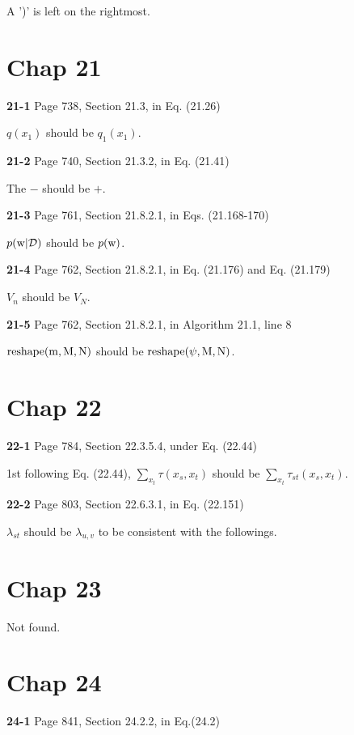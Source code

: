 \documentclass[aps,preprint,a4]{revtex4-1}
\begin{document}
A ')' is left on the rightmost.




\section{Chap 21}
{\color{red}\textbf{21-1}} Page 738, Section 21.3, in Eq. (21.26) 

$q(x_{1})$ should be $q_{1}(x_{1})$.

{\color{red}\textbf{21-2}} Page 740, Section 21.3.2, in Eq. (21.41)

The $-$ should be $+$.

{\color{red}\textbf{21-3}} Page 761, Section 21.8.2.1, in Eqs. (21.168-170)

$p(\rm w|\mathcal D)$ should be $p(\rm w)$.

{\color{red}\textbf{21-4}} Page 762, Section 21.8.2.1, in Eq. (21.176) and Eq. (21.179)

$V_{n}$ should be $V_{N}$.

{\color{red}\textbf{21-5}} Page 762, Section 21.8.2.1, in Algorithm 21.1, line 8

$\rm reshape(m,M,N)$ should be $\rm reshape(\psi,M,N)$.




\section{Chap 22}
{\color{red}\textbf{22-1}} Page 784, Section 22.3.5.4, under Eq. (22.44)

1st following Eq. (22.44), $\sum_{x_{t}}\tau(x_{s},x_{t})$ should be $\sum_{x_{t}}\tau_{st}(x_{s},x_{t})$.

{\color{red}\textbf{22-2}} Page 803, Section 22.6.3.1, in Eq. (22.151)

$\lambda_{st}$ should be $\lambda_{u,v}$ to be consistent with the followings.


\section{Chap 23}
Not found.




\section{Chap 24}
{\color{red}\textbf{24-1}} Page 841, Section 24.2.2, in Eq.(24.2)
\end{document}
